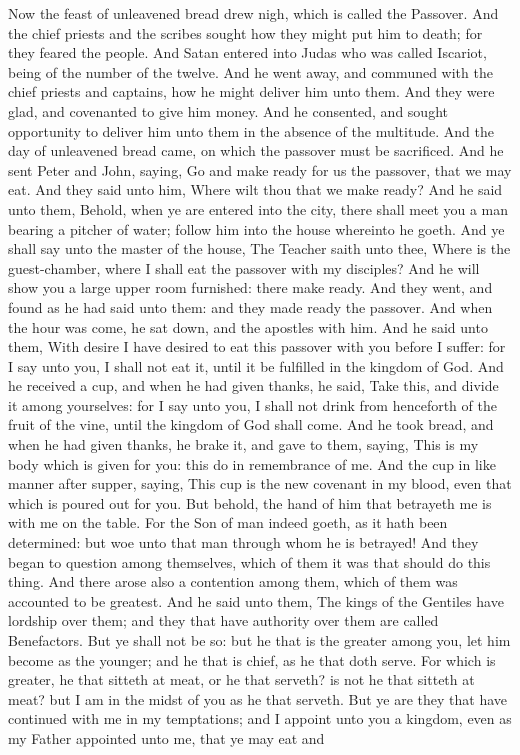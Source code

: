 Now the feast of unleavened bread drew nigh, which is called the Passover. And the chief priests and the scribes sought how they might put him to death; for they feared the people.  And Satan entered into Judas who was called Iscariot, being of the number of the twelve. And he went away, and communed with the chief priests and captains, how he might deliver him unto them. And they were glad, and covenanted to give him money. And he consented, and sought opportunity to deliver him unto them in the absence of the multitude.  And the day of unleavened bread came, on which the passover must be sacrificed. And he sent Peter and John, saying, Go and make ready for us the passover, that we may eat. And they said unto him, Where wilt thou that we make ready? And he said unto them, Behold, when ye are entered into the city, there shall meet you a man bearing a pitcher of water; follow him into the house whereinto he goeth. And ye shall say unto the master of the house, The Teacher saith unto thee, Where is the guest-chamber, where I shall eat the passover with my disciples? And he will show you a large upper room furnished: there make ready. And they went, and found as he had said unto them: and they made ready the passover.  And when the hour was come, he sat down, and the apostles with him. And he said unto them, With desire I have desired to eat this passover with you before I suffer: for I say unto you, I shall not eat it, until it be fulfilled in the kingdom of God. And he received a cup, and when he had given thanks, he said, Take this, and divide it among yourselves: for I say unto you, I shall not drink from henceforth of the fruit of the vine, until the kingdom of God shall come. And he took bread, and when he had given thanks, he brake it, and gave to them, saying, This is my body which is given for you: this do in remembrance of me. And the cup in like manner after supper, saying, This cup is the new covenant in my blood, even that which is poured out for you. But behold, the hand of him that betrayeth me is with me on the table. For the Son of man indeed goeth, as it hath been determined: but woe unto that man through whom he is betrayed! And they began to question among themselves, which of them it was that should do this thing.  And there arose also a contention among them, which of them was accounted to be greatest. And he said unto them, The kings of the Gentiles have lordship over them; and they that have authority over them are called Benefactors. But ye shall not be so: but he that is the greater among you, let him become as the younger; and he that is chief, as he that doth serve. For which is greater, he that sitteth at meat, or he that serveth? is not he that sitteth at meat? but I am in the midst of you as he that serveth. But ye are they that have continued with me in my temptations; and I appoint unto you a kingdom, even as my Father appointed unto me, that ye may eat and 